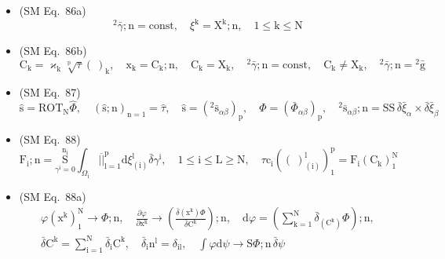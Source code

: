 \documentclass[
    12pt,              %
    a4paper,           %
    headings=normal,   %
    twoside=true,      %
    BCOR=8mm,          %
]{scrbook}
\begin{document}
\begin{itemize}[label={},leftmargin=0pt]
    \item (SM Eq.\ 86a) 
    \[
    {}^2\bar{\gamma};\mathrm{n} = \mathrm{const}, \quad \xi^\mathrm{k} = \mathrm{X^k};\mathrm{n}, \quad 1 \le \mathrm{k} \le \mathrm{N}
    \]

    \item (SM Eq.\ 86b) 
    \[
    \mathrm{C_k} = \varkappa_\mathrm{k} \sqrt[\mathrm{p}]{\tau} (\ )_\mathrm{k}, \quad \mathrm{x_k} = \mathrm{C_k};\mathrm{n}, \quad \mathrm{C_k} = \mathrm{X_k}, \quad {}^2\bar{\gamma};\mathrm{n} = \mathrm{const}, \quad \mathrm{C_k} \ne \mathrm{X_k}, \quad {}^2\bar{\gamma};\mathrm{n} = {}^2\bar{\mathrm{g}}
    \]

    \item (SM Eq.\ 87) 
    \[
    \hat{\mathrm{s}} = \mathrm{ROT}_\mathrm{N} \widehat{\Phi}, \quad (\hat{\mathrm{s}};\mathrm{n})_{\mathrm{n=1}} = \hat{\tau}, \quad \hat{\mathrm{s}} = \left({}^2\bar{\mathrm{s}}_{\alpha\beta}\right)_\mathrm{p}, \quad \widehat{\Phi} = \left( \bar{\Phi}_{\alpha\beta} \right)_\mathrm{p}, \quad {}^2\bar{\mathrm{s}}_{\alpha\beta};\mathrm{n} = \mathrm{SS}\,\bar{\delta}\bar{\xi}_\alpha \times \bar{\delta}\bar{\xi}_\beta
    \]

    \item (SM Eq.\ 88) 
    \[
    \mathrm{F_i};\mathrm{n} = \underset{\gamma^\mathrm{i}=0}{\overset{\mathrm{n_i}}{\mathrm{S}}} \int_{\Omega_\mathrm{i}} \overline{||}_{\mathrm{l}=1}^\mathrm{p} \mathrm{d}\xi^\mathrm{l}_{(\mathrm{i})} \bar{\delta}\gamma^\mathrm{i}, \quad 1 \le \mathrm{i} \le \mathrm{L} \ge \mathrm{N}, \quad \tau \mathrm{c_i} \left( (\ )^\mathrm{l}_{(\mathrm{i})} \right)_1^\mathrm{p} = \mathrm{F_i}(\mathrm{C_k})_1^\mathrm{N}
    \]

    \item (SM Eq.\ 88a) 
    \[
    \begin{gathered}
    \varphi(\mathrm{x^k})_1^\mathrm{N} \to \Phi;\mathrm{n}, \quad \frac{\partial\varphi}{\partial \mathrm{x^k}} \to \left( \frac{\bar{\delta}\left(\mathrm{x^k}\right)\Phi}{\bar{\delta}\mathrm{C^k}} \right);\mathrm{n}, \quad \mathrm{d}\varphi = \left( \sum_{\mathrm{k}=1}^\mathrm{N} \bar{\delta}_{(\mathrm{C^k})} \Phi \right);\mathrm{n}, \\
    \bar{\delta}\mathrm{C^k} = \sum_{\mathrm{i}=1}^\mathrm{N} \bar{\delta}_\mathrm{i} \mathrm{C^k}, \quad \bar{\delta}_\mathrm{i} \mathrm{n^l} = \delta_{\mathrm{il}}, \quad \int \varphi \mathrm{d}\psi \to \mathrm{S}\Phi;\mathrm{n}\,\bar{\delta}\psi
    \end{gathered}
    \]


\end{itemize}
\end{document}
